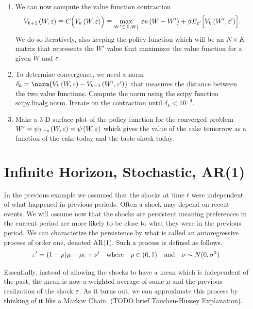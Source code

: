 \begin{problem}
\begin{enumerate}
   \item We can now compute the value function contraction 
     \begin{equation}\label{EqContractStochiid}
      V_{k+1}\left(W,\varepsilon\right) \equiv C\Bigl(V_k\left(W,\varepsilon\right)\Bigr) \equiv \max_{W'\in[0,W]}\: \varepsilon u\left(W-W'\right) + \beta E_{\varepsilon'}\Bigl[V_k\left(W',\varepsilon'\right)\Bigr].
      \end{equation}
        We do so iteratively, also keeping the policy function which will be an $N\times K$ matrix that represents the $W'$ value that maximizes the value function for a given $W$ and $\varepsilon$.

   \item To determine convergence, we need a norm $\delta_k = \norm{V_k\left(W,\ve\right) - V_{k-1}\left(W',\ve'\right)}$ that measures the distance between the two value functions.  Compute the norm using the scipy function scipy.linalg.norm.  Iterate on the contraction until $\delta_k < 10^{-9}$.
       
   \item Make a 3-D surface plot of the policy function for the converged problem $W' = \psi_{T-s}\left(W,\varepsilon\right) = \psi\left(W,\varepsilon\right)$ which gives the value of the cake tomorrow as a function of the cake today  and the taste shock today.

\end{enumerate}
\end{problem}

\newpage
\section{Infinite Horizon, Stochastic, AR(1)}\label{SecRecProbInfinHorStochAR1}

In the previous example we assumed that the shocks at time $t$ were independent of what happened in previous periods.  Often a shock may depend on recent events.  We will assume now that the shocks are persistent meaning preferences in the current period are more likely to be close to what they were in the previous period.  We can characterize the persistence by what is called an autoregressive process of order one, denoted AR(1).  Such a process is defined as follows.
\begin{equation}\label{EqAR1shock}
   \varepsilon' = (1-\rho)\mu + \rho\varepsilon + \nu' \quad\text{where}\quad \rho\in(0,1) \quad\text{and}\quad \nu\sim N(0,\sigma^2)
\end{equation}

Essentially, instead of allowing the shocks to have a mean which is independent of the past, the mean is now a weighted average of some $\mu$ and the previous realization of the shock $\varepsilon$.  As it turns out, we can approximate this process by thinking of it like a Markov Chain. (TODO brief Tauchen-Hussey Explanation).


